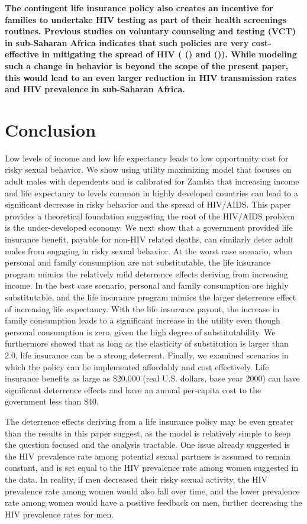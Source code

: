\documentclass[12pt]{article}
\newcommand{\citee}[1]{\citename{#1} (\citeyear{#1})}
\begin{document}
\textbf{The contingent life insurance policy also creates an incentive for families to undertake HIV testing as part of their health screenings routines.  Previous studies on voluntary counseling and testing (VCT) in sub-Saharan Africa indicates that such policies are very cost-effective in mitigating the spread of HIV (\citee{B2010} and \citee{Setal2000}).  While modeling such a change in behavior is beyond the scope of the present paper, this would lead to an even larger reduction in HIV transmission rates and HIV prevalence in sub-Saharan Africa.}

\section{Conclusion}
Low levels of income and low life expectancy leads to low opportunity cost for risky sexual behavior.  We show using utility maximizing model that focuses on adult males with dependents and is calibrated for Zambia that increasing income and life expectancy to levels common in highly developed countries can lead to a significant decrease in risky behavior and the spread of HIV/AIDS.  This paper provides a theoretical foundation suggesting the root of the HIV/AIDS problem is the under-developed economy.  We next show that a government provided life insurance benefit, payable for non-HIV related deaths, can similarly deter adult males from engaging in risky sexual behavior.  At the worst case scenario, when personal and family consumption are not substitutable, the life insurance program mimics the relatively mild deterrence effects deriving from increasing income.  In the best case scenario, personal and family consumption are highly substitutable, and the life insurance program mimics the larger deterrence effect of increasing life expectancy.  With the life insurance payout, the increase in family consumption leads to a significant increase in the utility even though personal consumption is zero, given the high degree of substitutability.  We furthermore showed that as long as the elasticity of substitution is larger than 2.0, life insurance can be a strong deterrent.  Finally, we examined scenarios in which the policy can be implemented affordably and cost effectively.  Life insurance benefits as large as \$20,000 (real U.S. dollars, base year 2000) can have significant deterrence effects and have an annual per-capita cost to the government less than \$40.

The deterrence effects deriving from a life insurance policy may be even greater than the results in this paper suggest, as the model is relatively simple to keep the question focused and the analysis tractable.  One issue already suggested is the HIV prevalence rate among potential sexual partners is assumed to remain constant, and is set equal to the HIV prevalence rate among women suggested in the data.  In reality, if men decreased their risky sexual activity, the HIV prevalence rate among women would also fall over time, and the lower prevalence rate among women would have a positive feedback on men, further decreasing the HIV prevalence rates for men.
\end{document}
